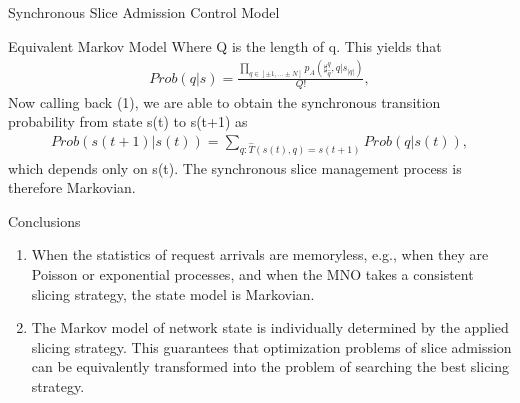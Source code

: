 \documentclass{beamer}
\begin{document}
\begin{frame}{Synchronous Slice Admission Control Model}
\begin{block}{Equivalent Markov Model}
 Where Q is the length of q. This yields that \\
    \begin{align}
      Prob(q|s) = \frac{\prod_{q\in [\pm 1,...\pm N]}p_{A}(\sharp_{\hat{q}}^{q},q |s_{|q|})}{Q!},
    \end{align}
    Now calling back (1), we are able to obtain the synchronous transition probability from state s(t) to s(t+1) as\\
    \begin{align}
        Prob(s(t+1)|s(t)) = \sum_{q:\hat{T}(s(t),q)= s(t+1)} Prob(q|s(t)),
    \end{align}
    which depends only on s(t). The synchronous slice management process is therefore Markovian. 
\end{block}
\end{frame}
\begin{frame}{Conclusions}
\begin{enumerate}
    \item When the  statistics of request arrivals are memoryless, e.g., when they are Poisson or exponential processes, and when the MNO takes a consistent slicing strategy, the state model is Markovian.
    \item The Markov model of network state is individually determined by the applied slicing strategy. This guarantees that optimization problems of slice admission can be equivalently transformed into the problem of searching the best slicing strategy.  
 
\end{enumerate}
\end{frame}
\end{document}

